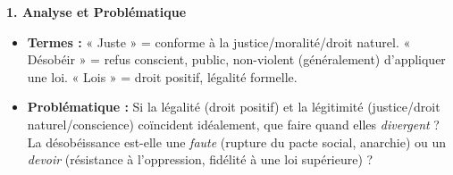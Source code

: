 \documentclass[11pt]{article}
\begin{document}
\begin{corrige}
\textbf{1. Analyse et Problématique}
\begin{itemize}
    \item \textbf{Termes :} « Juste » = conforme à la justice/moralité/droit naturel. « Désobéir » = refus conscient, public, non-violent (généralement) d'appliquer une loi. « Lois » = droit positif, légalité formelle.
    \item \textbf{Problématique :} Si la légalité (droit positif) et la légitimité (justice/droit naturel/conscience) coïncident idéalement, que faire quand elles \emph{divergent} ? La désobéissance est-elle une \emph{faute} (rupture du pacte social, anarchie) ou un \emph{devoir} (résistance à l'oppression, fidélité à une loi supérieure) ?
\end{itemize}


\end{corrige}
\end{document}
